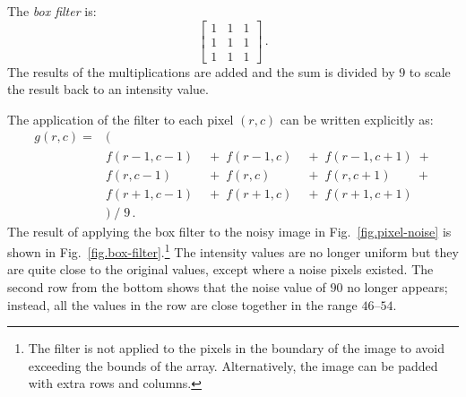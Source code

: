 The \emph{box filter} is:
\[
\left[
\begin{array}{ccc}
1 & 1 & 1\\
1 & 1 & 1\\
1 & 1 & 1
\end{array}
\right]\,.
\]
The results of the multiplications are added and the sum is divided by $9$ to scale the result back to an intensity value.

The application of the filter to each pixel $(r,c)$ can be written explicitly as:
\[
\begin{array}{llll}
g(r,c) = &(\\
&f(r-1,c-1) & \;+\; f(r-1,c) & \;+\; f(r-1,c+1) \;+\\
&f(r,c-1) & \;+\; f(r,c) & \;+\; f(r,c+1) \;\;\;\;\;\;\;+\\
&f(r+1,c-1) & \;+\; f(r+1,c) & \;+\; f(r+1,c+1)\\
& ) \; / \; 9\,.
\end{array}
\]
The result of applying the box filter to the noisy image in Fig.~\ref{fig.pixel-noise} is shown in Fig.~\ref{fig.box-filter}.\footnote{The filter is not applied to the pixels in the boundary of the image to avoid exceeding the bounds of the array. Alternatively, the image can be padded with extra rows and columns.} The intensity values are no longer uniform but they are quite close to the original values, except where a noise pixels existed. The second row from the bottom shows that the noise value of $90$ no longer appears; instead, all the values in the row are close together in the range $46$--$54$.
